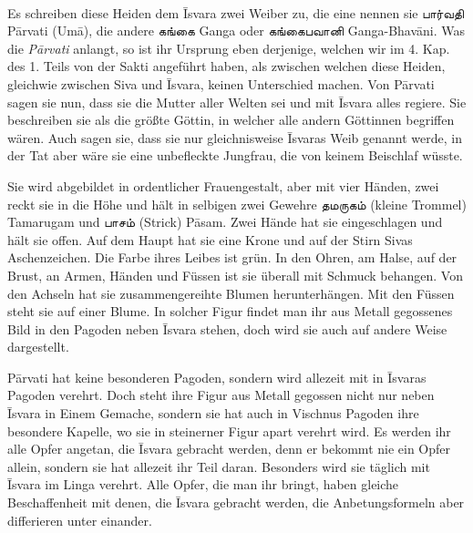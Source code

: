 \documentclass{article}
\newcommand{\TamilText}[1]{\texttamil{#1}}
\newcommand{\tam}[1]{\TamilText{#1}}
\begin{document}
\paragraph{}
Es schreiben diese Heiden dem \={I}svara zwei Weiber zu, die eine nennen sie \tam{பார்வதி} P\={a}rvati (Um\={a}), die andere \tam{கங்கை} Ganga oder \tam{கங்கைபவானி} Ganga-Bhav\={a}ni. Was die \emph{P\={a}rvati} anlangt, so ist ihr Ursprung eben derjenige, welchen wir im 4. Kap. des 1. Teils von der Sakti angeführt haben, als zwischen welchen diese Heiden, gleichwie zwischen Siva und \={I}svara, keinen Unterschied machen. Von P\={a}rvati sagen sie nun, dass sie die Mutter aller Welten sei und mit \={I}svara alles regiere. Sie beschreiben sie als die größte Göttin, in welcher alle andern Göttinnen begriffen wären. Auch sagen sie, dass sie nur gleichnisweise \={I}svaras Weib genannt werde, in der Tat aber wäre sie eine unbefleckte Jungfrau, die von keinem Beischlaf wüsste.

Sie wird abgebildet in ordentlicher Frauengestalt, aber mit vier Händen, zwei reckt sie in die Höhe und hält in selbigen zwei Gewehre \tam{தமருகம்} (kleine Trommel) Tamarugam und \tam{பாசம்} (Strick) P\={a}sam. Zwei Hände hat sie eingeschlagen und hält sie offen. Auf dem Haupt hat sie eine Krone und auf der Stirn Sivas Aschenzeichen. Die Farbe ihres Leibes ist grün. In den Ohren, am Halse, auf der Brust, an Armen, Händen und Füssen ist sie überall mit Schmuck behangen. Von den Achseln hat sie zusammengereihte Blumen herunterhängen. Mit den Füssen steht sie auf einer Blume. In solcher Figur findet man ihr aus Metall gegossenes Bild in den Pagoden neben \={I}svara stehen, doch wird sie auch auf andere Weise dargestellt.

P\={a}rvati hat keine besonderen Pagoden, sondern wird allezeit mit in \={I}svaras Pagoden verehrt. Doch steht ihre Figur aus Metall gegossen nicht nur neben \={I}svara in Einem Gemache, sondern sie hat auch in Vischnus Pagoden ihre besondere Kapelle, wo sie in steinerner Figur apart verehrt wird. Es werden ihr alle Opfer angetan, die \={I}svara gebracht werden, denn er bekommt nie ein Opfer allein, sondern sie hat allezeit ihr Teil daran. Besonders wird sie täglich mit \={I}svara im Linga verehrt. Alle Opfer, die man ihr bringt, haben gleiche Beschaffenheit mit denen, die \={I}svara gebracht werden, die Anbetungsformeln aber differieren unter einander.
\end{document}
